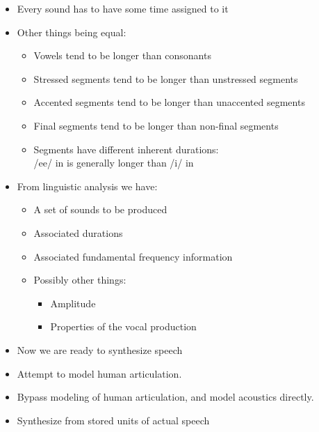 \documentclass[a4paper,landscape,headrule,footrule,xetex]{foils}
\begin{document}
\begin{itemize}
\item Every sound has to have some time assigned to it
\item Other things being equal:
  \begin{itemize}
  \item Vowels tend to be longer than consonants
  \item Stressed segments tend to be longer than unstressed segments
  \item Accented segments tend to be longer than unaccented segments
  \item Final segments tend to be longer than non-final segments
  \item Segments have different inherent durations: 
    \\ /ee/ in  is generally longer than /i/ in 
    \end{itemize}
  \end{itemize}
  \begin{itemize}
  \item From linguistic analysis we have:
    \begin{itemize}
    \item A set of sounds to be produced
    \item   Associated durations
    \item   Associated fundamental frequency information
    \item   Possibly other things:
          \begin{itemize}
            \item Amplitude
           \item  Properties of the vocal production
          \end{itemize}
        \end{itemize}
      \item Now we are ready to synthesize speech
  \end{itemize}



  \begin{itemize}
  \item {} Attempt to model human articulation.
  \item {} Bypass modeling of human articulation, and model acoustics directly.
  \item {} Synthesize from stored units of actual speech
  \end{itemize}
  
\end{document}
